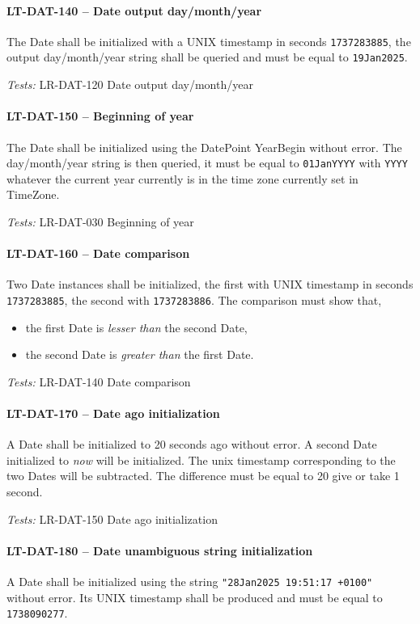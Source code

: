 \paragraph{LT-DAT-140 -- Date output day/month/year}
The Date shall be initialized with a UNIX timestamp in seconds
\lstinline{1737283885}, the output day/month/year string shall
be queried and must be equal to \lstinline{19Jan2025}.

\textit{Tests: } LR-DAT-120 Date output day/month/year

\paragraph{LT-DAT-150 -- Beginning of year}
The Date shall be initialized using the DatePoint YearBegin without error.
The day/month/year string is then queried, it must be equal to
\lstinline{01JanYYYY} with \lstinline{YYYY} whatever the current year
currently is in the time zone currently set in TimeZone.

\textit{Tests: } LR-DAT-030 Beginning of year

\paragraph{LT-DAT-160 -- Date comparison}
Two Date instances shall be initialized, the first with
UNIX timestamp in seconds \lstinline{1737283885}, the second with
\lstinline{1737283886}.
The comparison must show that,
\begin{itemize}
\item the first Date is \emph{lesser than} the second Date,
\item the second Date is \emph{greater than} the first Date.
\end{itemize}

\textit{Tests: } LR-DAT-140 Date comparison

\paragraph{LT-DAT-170 -- Date ago initialization}
A Date shall be initialized to 20 seconds ago without error.
A second Date initialized to \emph{now} will be initialized.
The unix timestamp corresponding to the two Dates will be
subtracted. The difference must be equal to 20 give or take 1 second.

\textit{Tests: } LR-DAT-150 Date ago initialization

\paragraph{LT-DAT-180 -- Date unambiguous string initialization}
A Date shall be initialized using the string
\lstinline{"28Jan2025 19:51:17 +0100"} without error.
Its UNIX timestamp shall be produced and must be equal to
\lstinline{1738090277}.

